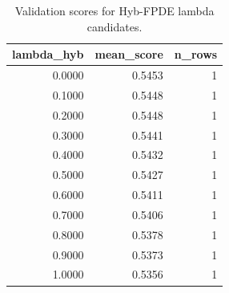 \begin{table}[t]
\caption{Validation scores for Hyb-FPDE lambda candidates.}
\label{tab:lambda_distribution_computed}
\centering
\begin{tabular}{rrr}
\toprule
lambda\_hyb & mean\_score & n\_rows \\
\midrule
0.0000 & 0.5453 & 1 \\
0.1000 & 0.5448 & 1 \\
0.2000 & 0.5448 & 1 \\
0.3000 & 0.5441 & 1 \\
0.4000 & 0.5432 & 1 \\
0.5000 & 0.5427 & 1 \\
0.6000 & 0.5411 & 1 \\
0.7000 & 0.5406 & 1 \\
0.8000 & 0.5378 & 1 \\
0.9000 & 0.5373 & 1 \\
1.0000 & 0.5356 & 1 \\
\bottomrule
\end{tabular}

\end{table}
